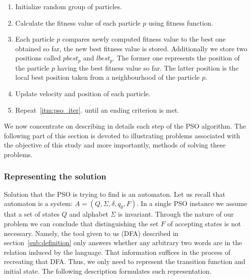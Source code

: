 \documentclass[runningheads,a4paper]{llncs}
\begin{document}
\begin{center}

\begin{enumerate}
	\item Initialize random group of particles.
	\item \label{itm:pso_iter} Calculate the fitness value of each particle $p$ using fitness function.
		
	\item Each particle $p$ compares newly computed fitness value to the best one obtained so far, the new best fitness value is stored. Additionally we store two positions called $pbest_p$ and $lbest_p$. The former one represents the position of the particle $p$ having the best fitness value so far. The latter position is the local best position taken from a neighbourhood of the particle $p$.
	
	\item Update velocity and position of each particle.
	
	\item Repeat~\ref{itm:pso_iter}. until an ending criterion is met.
	
\end{enumerate}

\end{center}

We now concentrate on describing in details each step of the PSO algorithm. The following part of this section is devoted to illustrating problems associated with the objective of this study and more importantly, methods of solving these problems.


\subsubsection{Representing the solution}

Solution that the PSO is trying to find is an automaton. Let us recall that automaton is a system: $A = (Q, \Sigma, \delta, q_0, F)$. In a single PSO instance we assume that a set of states $Q$ and alphabet $\Sigma$ is invariant. Through the nature of our problem we can conclude that distinguishing the set $F$ of accepting states is not necessary. Namely, the tool given to us (DFA) described in section~\ref{sub:definition} only answers whether any arbitrary two words are in the relation induced by the language. That information suffices in the process of recreating that DFA. Thus, we only need to represent the transition function and initial state. The following description formulates such representation.
\end{document}
